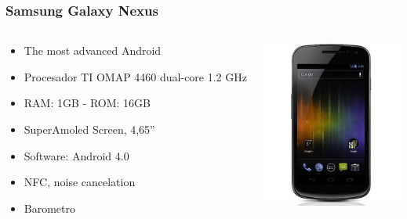\documentclass{beamer}
\begin{document}
\begin{frame}
\frametitle{Samsung Galaxy Nexus}

\begin{columns}
\begin{column}{0.5\textwidth}

\begin{itemize}

\item The most advanced Android
\item Procesador TI OMAP 4460 dual-core 1.2 GHz
\item RAM: 1GB - ROM: 16GB
\item SuperAmoled Screen, 4,65''
\item Software: Android 4.0
\item NFC, noise cancelation
\item Barometro
\end{itemize}
\end{column}

\begin{column}{0.5\textwidth}
\begin{center}
  \includegraphics[height=5.5cm]{figs/samsung-galaxy-nexus1}
\end{center}
\end{column}
\end{columns}
\end{frame}
\end{document}
